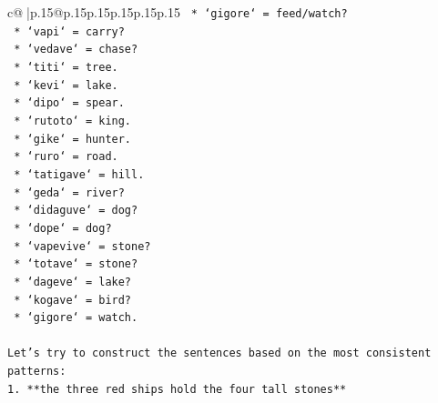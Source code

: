 \documentclass{article}
\begin{document}
{\begin{supertabular}{c@{$\;$}|p{.15\linewidth}@{}p{.15\linewidth}p{.15\linewidth}p{.15\linewidth}p{.15\linewidth}p{.15\linewidth}}
{{{\texttt{                        *   `gigore` = feed/watch?} \\
\texttt{                        *   `vapi` = carry?} \\
\texttt{                        *   `vedave` = chase?} \\
\texttt{                        *   `titi` = tree.} \\
\texttt{                        *   `kevi` = lake.} \\
\texttt{                        *   `dipo` = spear.} \\
\texttt{                        *   `rutoto` = king.} \\
\texttt{                        *   `gike` = hunter.} \\
\texttt{                        *   `ruro` = road.} \\
\texttt{                        *   `tatigave` = hill.} \\
\texttt{                        *   `geda` = river?} \\
\texttt{                        *   `didaguve` = dog?} \\
\texttt{                        *   `dope` = dog?} \\
\texttt{                        *   `vapevive` = stone?} \\
\texttt{                        *   `totave` = stone?} \\
\texttt{                        *   `dageve` = lake?} \\
\texttt{                        *   `kogave` = bird?} \\
\texttt{                        *   `gigore` = watch.} \\
\\ 
\texttt{Let's try to construct the sentences based on the most consistent patterns:} \\
\texttt{1.  **the three red ships hold the four tall stones**} \\
}}}
\end{supertabular}}
\end{document}
